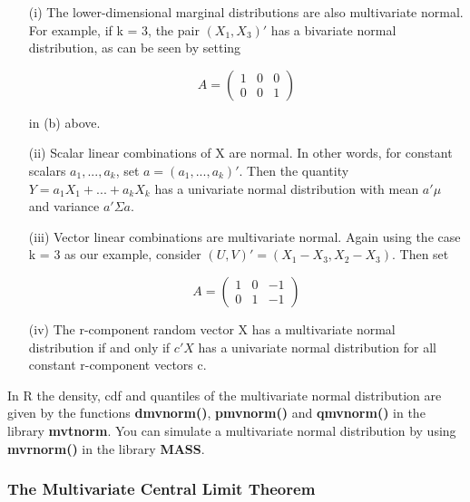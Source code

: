 \begin{itemize}

   \item [(i)] The lower-dimensional marginal distributions are also
   multivariate normal.  For example, if k = 3, the pair $(X_1,X_3)'$
   has a bivariate normal distribution, as can be seen by setting 

   \begin{equation} A = \left ( \begin{array}{ccc} 1 & 0 & 0\\ 0 & 0 & 1
   \end{array} \right )     \end{equation}

   in (b) above.
   
   \item [(ii)] Scalar linear combinations of X are normal.  In other
   words, for constant scalars $a_1,...,a_k$, set $a = (a_1,...,a_k)'$.
   Then the quantity $Y = a_1 X_1 +...+ a_k X_k$ has a univariate normal
   distribution with mean  $a' \mu$ and variance $a' \Sigma a$. 

   \item [(iii)] Vector linear combinations are multivariate normal.
   Again using the case k = 3 as our example, consider $(U,V)' =
   (X_1-X_3,X_2-X_3)$.  Then set

   \begin{equation}
   A = 
      \left (
      \begin{array}{ccc}
      1 & 0 & -1\\
      0 & 1 & -1   
      \end{array}
      \right )     
   \end{equation}

   \item [(iv)] The r-component random vector X has a multivariate normal
   distribution if and only if $c'X$ has a univariate normal
   distribution for all constant r-component vectors c.

\end{itemize}

In R the density, cdf and quantiles of the multivariate normal
distribution are given by the functions {\bf dmvnorm()}, {\bf pmvnorm()} 
and {\bf qmvnorm()} in the library {\bf mvtnorm}.  You can simulate a
multivariate normal distribution by using {\bf mvrnorm()} in the library
{\bf MASS}.

\subsubsection{The Multivariate Central Limit Theorem}

